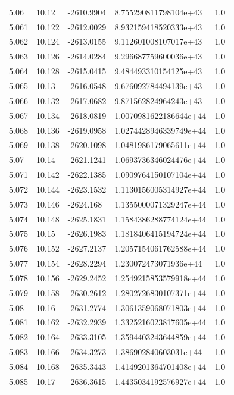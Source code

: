 \begin{tabular}{lllll}
5.06 & 10.12 & -2610.9904 & 8.755290811798104e+43 & 1.0 \\
5.061 & 10.122 & -2612.0029 & 8.932159418520333e+43 & 1.0 \\
5.062 & 10.124 & -2613.0155 & 9.112601008107017e+43 & 1.0 \\
5.063 & 10.126 & -2614.0284 & 9.296687759600036e+43 & 1.0 \\
5.064 & 10.128 & -2615.0415 & 9.484493310154125e+43 & 1.0 \\
5.065 & 10.13 & -2616.0548 & 9.676092784494139e+43 & 1.0 \\
5.066 & 10.132 & -2617.0682 & 9.871562824964243e+43 & 1.0 \\
5.067 & 10.134 & -2618.0819 & 1.0070981622186644e+44 & 1.0 \\
5.068 & 10.136 & -2619.0958 & 1.0274428946339749e+44 & 1.0 \\
5.069 & 10.138 & -2620.1098 & 1.0481986179065611e+44 & 1.0 \\
5.07 & 10.14 & -2621.1241 & 1.0693736346024476e+44 & 1.0 \\
5.071 & 10.142 & -2622.1385 & 1.0909764150107104e+44 & 1.0 \\
5.072 & 10.144 & -2623.1532 & 1.1130156005314927e+44 & 1.0 \\
5.073 & 10.146 & -2624.168 & 1.1355000071329247e+44 & 1.0 \\
5.074 & 10.148 & -2625.1831 & 1.1584386288774124e+44 & 1.0 \\
5.075 & 10.15 & -2626.1983 & 1.1818406415194724e+44 & 1.0 \\
5.076 & 10.152 & -2627.2137 & 1.2057154061762588e+44 & 1.0 \\
5.077 & 10.154 & -2628.2294 & 1.230072473071936e+44 & 1.0 \\
5.078 & 10.156 & -2629.2452 & 1.2549215853579918e+44 & 1.0 \\
5.079 & 10.158 & -2630.2612 & 1.2802726830107371e+44 & 1.0 \\
5.08 & 10.16 & -2631.2774 & 1.3061359068071803e+44 & 1.0 \\
5.081 & 10.162 & -2632.2939 & 1.3325216023817605e+44 & 1.0 \\
5.082 & 10.164 & -2633.3105 & 1.3594403243644859e+44 & 1.0 \\
5.083 & 10.166 & -2634.3273 & 1.386902840603031e+44 & 1.0 \\
5.084 & 10.168 & -2635.3443 & 1.4149201364701408e+44 & 1.0 \\
5.085 & 10.17 & -2636.3615 & 1.4435034192576927e+44 & 1.0 \\

\end{tabular}
